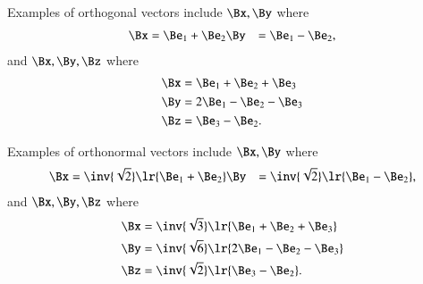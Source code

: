 %
%

Examples of orthogonal vectors
include \( \Bx, \By \) where
\begin{dmath}\label{eqn:prereq_standardbasis:300}
\begin{aligned}
\Bx &= \Be_1 + \Be_2
\By &= \Be_1 - \Be_2,
\end{aligned}
\end{dmath}
and \( \Bx, \By, \Bz \) where
\begin{dmath}\label{eqn:prereq_standardbasis:320}
\begin{aligned}
\Bx &= \Be_1 + \Be_2 + \Be_3 \\
\By &= 2 \Be_1 - \Be_2 - \Be_3 \\
\Bz &= \Be_3 - \Be_2.
\end{aligned}
\end{dmath}


Examples of orthonormal vectors
include \( \Bx, \By \) where
\begin{dmath}\label{eqn:prereq_standardbasis:340}
\begin{aligned}
\Bx &= \inv{\sqrt{2}}\lr{\Be_1 + \Be_2}
\By &= \inv{\sqrt{2}}\lr{\Be_1 - \Be_2},
\end{aligned}
\end{dmath}
and \( \Bx, \By, \Bz \) where
\begin{dmath}\label{eqn:prereq_standardbasis:360}
\begin{aligned}
\Bx &= \inv{\sqrt{3}}\lr{\Be_1 + \Be_2 + \Be_3} \\
\By &= \inv{\sqrt{6}}\lr{2 \Be_1 - \Be_2 - \Be_3} \\
\Bz &= \inv{\sqrt{2}}\lr{\Be_3 - \Be_2}.
\end{aligned}
\end{dmath}

